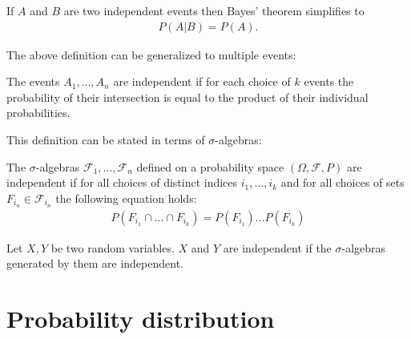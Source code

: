 	\begin{result}
		If $A$ and $B$ are two independent events then Bayes' theorem simplifies to
	    	\begin{gather}
			P(A|B) = P(A).
		\end{gather}
	\end{result}
	The above definition can be generalized to multiple events:
	\begin{definition}
		The events $A_1,...,A_n$ are independent if for each choice of $k$ events the probability of their intersection is equal to the product of their individual probabilities.
	\end{definition}
	This definition can be stated in terms of $\sigma$-algebras:
	\begin{definition}
		The $\sigma$-algebras $\mathcal{F}_1,...,\mathcal{F}_n$ defined on a probability space $(\Omega,\mathcal{F},P)$ are independent if for all choices of distinct indices $i_1,...,i_k$ and for all choices of sets $F_{i_n}\in\mathcal{F}_{i_n}$ the following equation holds:
	        \begin{gather}
	        	\label{prob:independent_sigma_algebras}
			P(F_{i_1}\cap...\cap F_{i_k}) = P(F_{i_1})...P(F_{i_k})
		\end{gather}
	\end{definition}
	\begin{result}
		Let $X,Y$ be two random variables. $X$ and $Y$ are independent if the $\sigma$-algebras generated by them are independent.
	\end{result}

\section{Probability distribution}



